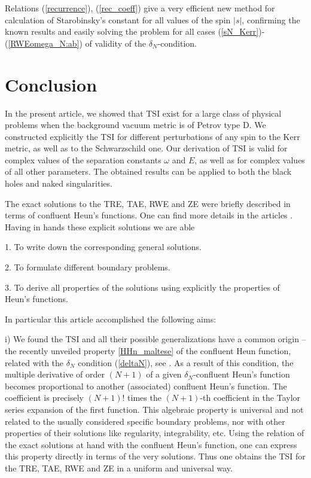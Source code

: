 \documentclass[prd,aps,twocolumn,leterpaper,preprintnumbers]{revtex4}
\numberwithin{equation}{section}
\begin{document}
Relations (\ref{recurrence}), (\ref{rec_coeff}) give a very efficient
new method for calculation of Starobinsky's constant
for all values of the spin $|s|$, confirming the known results and
easily solving the problem for all cases (\ref{sN_Kerr})-(\ref{RWEomega_N:ab})
of validity of the $\delta_N$-condition.


\section{Conclusion}
In the present article, we showed that TSI exist for a large class of physical problems
when the background vacuum metric is of Petrov type D.
We constructed explicitly the TSI for different perturbations of any spin to
the Kerr metric, as well as to the Schwarzschild one.
Our derivation of TSI is valid for complex values of the separation constants $\omega$ and $E$,
as well as for complex values of all other parameters.
The obtained results can be applied to both the black holes and naked singularities.

The exact solutions to the TRE, TAE, RWE and ZE were briefly described
in terms of confluent Heun's functions.
One can find more details in the articles \cite{Fiziev1}.
Having in hands these explicit solutions we are able

1. To write down the corresponding general solutions.

2. To formulate different boundary problems.

3. To derive all properties of the solutions
using explicitly the properties of Heun's functions.

In particular this article accomplished the following aims:

i) We found the TSI and all their possible generalizations have a common origin --
the recently unveiled property \eqref{HHn_maltese} of the confluent Heun function,
related with the $\delta_N$ condition (\ref{deltaN}), see \cite{Fiziev2}.
As a result of this condition, the multiple derivative of order $(N+1)$
of a given $\delta_N$-confluent Heun's function becomes
proportional to another (associated) confluent Heun's function.
The coefficient is precisely $(N+1)!$ times the $(N+1)$-th coefficient
in the Taylor series expansion of the first function.
This algebraic property is universal and not related to the usually considered specific
boundary problems, nor with other properties of their solutions like regularity, integrability,
etc.
Using the relation of the exact solutions at hand with the confluent Heun's function,
one can express this property directly in terms of the very solutions.
Thus one obtains the TSI for the TRE, TAE, RWE and ZE in a uniform and universal way.
\end{document}

